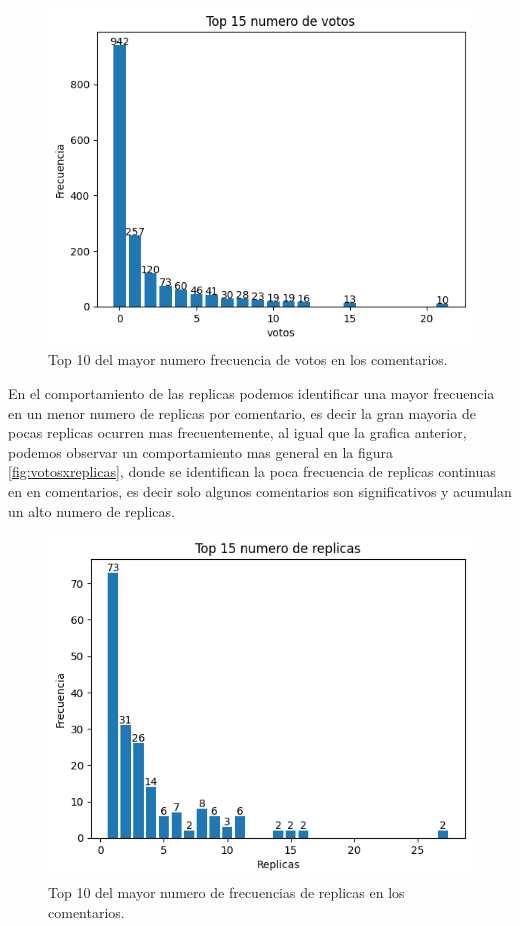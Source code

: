 \begin{figure}[h!]
	\centering
	\includegraphics[width=14cm]{../Datos/Top10Votos}
	\caption{Top 10 del mayor numero frecuencia de votos en los comentarios.}
	\label{fig:top10V}
\end{figure}

En el comportamiento de las replicas podemos identificar una mayor frecuencia en un menor numero de replicas por comentario, es decir la gran mayoria de pocas replicas ocurren mas frecuentemente, al igual que la grafica anterior, podemos observar un comportamiento mas general en la figura \ref{fig:votosxreplicas}, donde se identifican la poca frecuencia de replicas continuas en en comentarios, es decir solo algunos comentarios son significativos y acumulan un alto numero de replicas.\\

\begin{figure}[h!]
	\centering
	\includegraphics[width=14cm]{../Datos/Top10Replicas}
	\caption{Top 10 del mayor numero de frecuencias de replicas en los comentarios.}
	\label{fig:top10R}
\end{figure}


